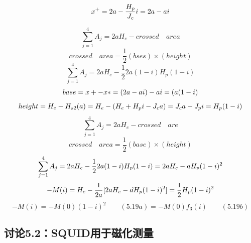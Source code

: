 \begin{equation}%
x^{+}=2a-\frac{H_{p}}{J_{c}}i=2a-ai\\
\end{equation}


\begin{equation}%
\sum_{j=1}^{4}A_{j}=2aH_{e}-crossed\quad area
\end{equation}
\begin{equation}%
crossed\quad area=\frac{1}{2}(bses)\times(height)
\end{equation}
\begin{equation}%
\sum_{j=1}^{4}A_{j}=2aH_{e}-\frac{1}{2}2a(1-i)H_{p}(1-i)
\end{equation}
\begin{equation}%
base=x+-x*=(2a-ai)-ai=(a(1-i)\\
\end{equation}
\begin{equation}%
height=H_{e}-H_{s2}(a)=H_{e}-(H_{e}+H_{p}i-J_{c}a)\\
=J_{c}a-J_{p}i=H_{p}(1-i)
\end{equation}
\begin{equation}%
\sum_{j=1}^{4}A_{j}=2aH_{e}-crossed\quad are
\end{equation}
\begin{equation}%
crossed\quad area=\frac{1}{2}(base)\times(height)
\end{equation}
\begin{equation}%
\sum_{j=1}^{4}A_{j}=2aH_{e}-\frac{1}{2}2a(1-i)H_{p}(1-i)\\
=2aH_{e}-aH_{p}(1-i)^{2}
\end{equation}
\begin{equation}%
-M(i)=H_{e}-\frac{1}{2a}[2aH_{e}-a \grave{}H_{p}(1-i)^{2}]\\
=\frac{1}{2}H_{p}(1-i)^{2}
\end{equation}
\begin{equation}%
-M(i)=-M(0)(1-i)^{2}\qquad(5.19a)
=-M(0)f_{3}(i)\qquad(5.19b)
\end{equation}



\subsection{讨论5.2：SQUID用于磁化测量}




